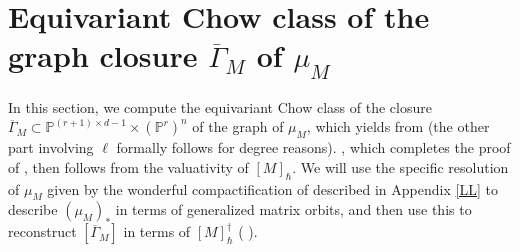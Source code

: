 \documentclass[12pt]{amsart}
\newcommand{\mb}{\mathbb}
\newcommand{\ol}{\overline}
\newcommand{\MM}{{\mathcal M}}
\newcommand{\NN}{{\mathcal N}}
\theoremstyle{plain}
\theoremstyle{definition}
\theoremstyle{remark}
\begin{document}

\section{Equivariant Chow class of the graph closure $\ol{\Gamma}_M$ of $\mu_M$}\label{graphclosuresection}
In this section, we compute the equivariant Chow class of the closure $\ol{\Gamma}_M \subset \mb{P}^{(r+1)\times d-1}\times (\mb{P}^r)^n$ of the graph of $\mu_M$, which yields  from  (the other part involving $\ell$ formally follows for degree reasons). , which completes the proof of , then follows from the valuativity of $[M]_{\hbar}$. We will use the specific resolution of $\mu_M$ given by the wonderful compactification of \cite{LiLi} described in Appendix \ref{LL} to describe $(\mu_M)_*$ in terms of generalized matrix orbits, and then use this to reconstruct $[\ol{\Gamma}_M]$ in terms of $[M]_{\hbar}^\dagger$ ( ).
\end{document}
